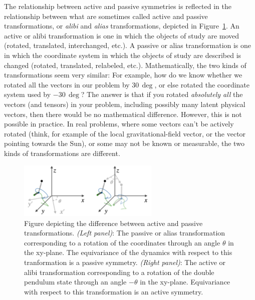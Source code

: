 \documentclass[preprint]{article} %
\newcommand{\figref}[1]{Figure~\ref{#1}}
\begin{document}
The relationship between active and passive symmetries is reflected in the relationship between what are sometimes called active and passive transformations, or \emph{alibi} and \emph{alias} transformations, depicted in \figref{fig:alias}.
An active or alibi transformation is one in which the objects of study are moved (rotated, translated, interchanged, etc.).
A passive or alias transformation is one in which the coordinate system in which the objects of study are described is changed (rotated, translated, relabeled, etc.).
Mathematically, the two kinds of transformations seem very similar:
For example, how do we know whether we rotated all the vectors in our problem by $30\,\deg$, or else rotated the coordinate system used by $-30\,\deg$?
The answer is that if you rotated \emph{absolutely all} the vectors (and tensors) in your problem, including possibly many latent physical vectors, then there would be no mathematical difference. However, this is not possible in practice. 
In real problems, where some vectors can't be actively rotated (think, for example of the local gravitational-field vector, or the vector pointing towards the Sun), or some may not be known or measurable, the two kinds of transformations are different.
\begin{figure}[t!]
    \centering
    \includegraphics[width=0.6\textwidth]{alias.png}
    \caption{Figure depicting the difference between active and passive transformations. \textsl{(Left panel)}: The passive or alias transformation corresponding to a rotation of the coordinates through an angle $\theta$ in the xy-plane. The equivariance of the dynamics with respect to this tranformation is a passive symmetry. \textsl{(Right panel)}: The active or alibi transformation corresponding to a rotation of the double pendulum state through an angle $-\theta$ in the xy-plane. Equivariance with respect to this transformation is an active symmetry.}
    \label{fig:alias}
\end{figure}
\end{document}
